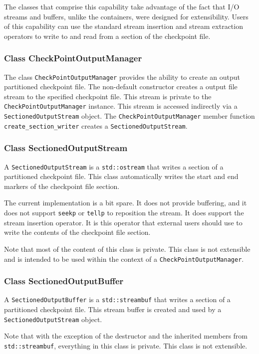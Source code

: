 The classes that comprise this capability take advantage of
the fact that \Cplusplus I/O streams and buffers,
unlike the \Cplusplus containers, were designed for extensibility.
Users of this capability can use the standard \Cplusplus stream insertion
and stream extraction operators to write to and read from a section
of the checkpoint file.


\subsubsection{Class CheckPointOutputManager}
The class \verb|CheckPointOutputManager| provides the ability to create
an output partitioned checkpoint file.
The non-default constructor creates a \Cplusplus output file stream to the
specified checkpoint file.
This stream is private to the \verb|CheckPointOutputManager| instance.
This stream is accessed indirectly via a \verb|SectionedOutputStream|
object.
The \verb|CheckPointOutputManager| member function \verb|create_section_writer|
creates a \verb|SectionedOutputStream|.

\subsubsection{Class SectionedOutputStream}
A \verb|SectionedOutputStream| is a \verb|std::ostream| that writes a section
of a partitioned checkpoint file. This class automatically writes the
start and end markers of the checkpoint file section.

The current implementation is a bit spare.
It does not provide buffering,
and it does not support \verb|seekp| or \verb|tellp|
to reposition the stream.
It does support the stream insertion operator.
It is this operator that external users should use to
write the contents of the checkpoint file section.

Note that most of the content of this class is private.
This class is not extensible and is intended to be used within the
context of a \verb|CheckPointOutputManager|.

\subsubsection{Class SectionedOutputBuffer}
A \verb|SectionedOutputBuffer| is a \verb|std::streambuf| that writes a section
of a partitioned checkpoint file. This stream buffer is created and used
by a \verb|SectionedOutputStream| object.

Note that with the exception of the destructor and the inherited members
from \verb|std::streambuf|, everything in this class is private.
This class is not extensible.

